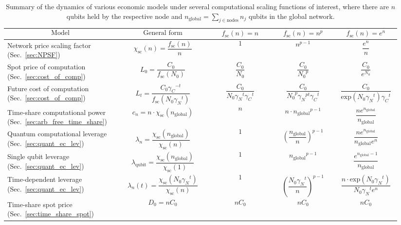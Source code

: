 \begin{table}[!htb]
\caption{Summary of the dynamics of various economic models under several computational scaling functions of interest, where there are $n$ qubits held by the respective node and \mbox{$n_\text{global}=\sum_{j\in \text{nodes}} n_j$} qubits in the global network.} \label{tab:summary_ec_models}
\begin{tabular}{|p{0.255\linewidth}|p{0.22\linewidth}|p{0.155\linewidth}|p{0.155\linewidth}|p{0.155\linewidth}|}
	\hline
	\[\text{Model}\] & \[\text{General form}\] & \[f_\text{sc}(n)=n^{}\] & \[f_\text{sc}(n)=n^p\] & \[f_\text{sc}(n)=e^n\]\\
	\hline \hline
	Network price scaling factor (Sec.~\ref{sec:NPSF}) & \[\chi_\text{sc}(n)=\frac{f_\text{sc}(n)}{n}\] & \[1\] & \[n^{p-1}\] & \[\frac{e^n}{n}\]\\
	\hline
	Spot price of computation (Sec.~\ref{sec:cost_of_comp}) & \[L_0=\frac{C_0}{f_\text{sc}(N_0)}\] & \[\frac{C_0}{N_0}\] & \[\frac{C_0}{{N_0}^p}\] & \[\frac{C_0}{e^{N_0}}\]\\
	\hline
	Future cost of computation (Sec.~\ref{sec:cost_of_comp}) & \[L_t=\frac{C_0 {\gamma_C}^{-t}}{f_\text{sc}(N_0 {\gamma_N}^t)}
\] & \[\frac{C_0}{N_0{\gamma_N}^{t}{\gamma_C}^{t}}\] & \[\frac{C_0}{{N_0}^p{\gamma_N}^{pt}{\gamma_C}^t}\] & \[\frac{C_0}{\text{exp}(N_0{\gamma_N}^t){\gamma_C}^t}\]\\
	\hline
	Time-share computational power (Sec.~\ref{sec:arb_free_time_share}) & \[c_n=n \cdot \chi_\text{sc}(n_\text{global})
\] & \[n\] & \[n\cdot{n_\text{global}}^{p-1}\] & \[\frac{n e^{n_\text{global}}}{n_\text{global}}\]\\
	\hline
	Quantum computational leverage (Sec.~\ref{sec:quant_ec_lev}) & \[\lambda_n=\frac{\chi_\text{sc}(n_\text{global})}{\chi_\text{sc}(n)}\] & \[1\] & \[\left(\frac{n_\text{global}}{n}\right)^{p-1}\] & \[\frac{n e^{n_\text{global}}}{n_\text{global}e^n}\]\\
	\hline
	Single qubit leverage (Sec.~\ref{sec:quant_ec_lev}) & \[\lambda_\text{qubit}=\frac{\chi_\text{sc}(n_\text{global})}{\chi_\text{sc}(1)}\] & \[1\] & \[{n_\text{global}}^{p-1}\] & \[\frac{e^{n_\text{global}-1}}{n_\text{global}}\]\\
	\hline
	Time-dependent leverage (Sec.~\ref{sec:quant_ec_lev}) & \[\lambda_n(t)=\frac{\chi_\text{sc}(N_0{\gamma_N}^t)}{\chi_\text{sc}(n)}\] &  \[1\] & \[\left(\frac{N_0{\gamma_N}^t}{n}\right)^{p-1}\] & \[\frac{n \cdot \text{exp}(N_0{\gamma_N}^t)}{N_0{\gamma_N}^t e^n}\]\\
	\hline
	Time-share spot price (Sec.~\ref{sec:time_share_spot}) & \[D_0=n C_0\] & \[nC_0\] & \[nC_0\] & \[nC_0\]\\

\end{tabular}
\end{table}
